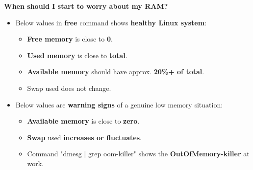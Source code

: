 \begin{flushleft}
	\textbf{When should I start to worry about my RAM?}
	\bigskip
	\begin{itemize}
		\item Below values in \textbf{free} command shows \color{blue} \textbf{healthy Linux system}\color{black}:
		\begin{itemize}
			\item \textbf{Free memory} is close to \textbf{0}.
			\item \textbf{Used memory} is close to \textbf{total}.
			\item \textbf{Available memory} should have approx. \textbf{20\%+ of total}.
			\item Swap used does not change.
		\end{itemize}
		\bigskip
		\item  Below values are \color{red} \textbf{warning signs} \color{black} of a genuine low memory situation:
		\begin{itemize}
			\item \textbf{Available memory} is close to \textbf{zero}.
			\item \textbf{Swap} used \textbf{increases or fluctuates}.
			\item Command "dmesg | grep oom-killer" shows the \textbf{OutOfMemory-killer} at work.
		\end{itemize}
	\end{itemize}
	
	
\end{flushleft}

\newpage


